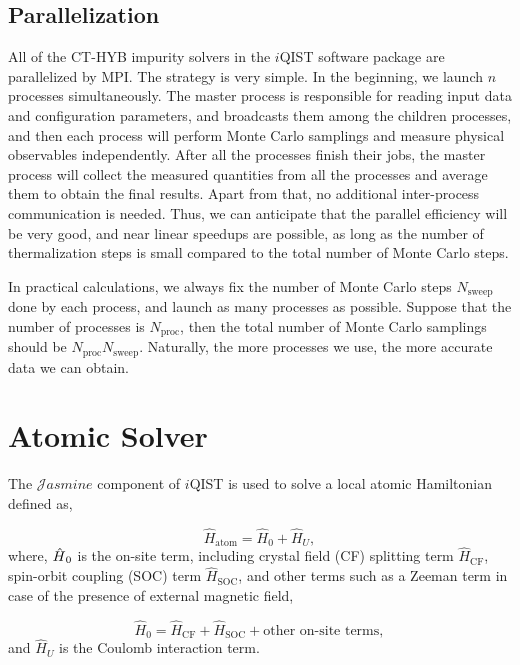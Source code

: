 \subsection{Parallelization}
All of the CT-HYB impurity solvers in the $i$QIST software package are parallelized by MPI. The strategy is very simple. In the beginning, we launch $n$ processes simultaneously. The master process is responsible for reading input data and configuration parameters, and broadcasts them among the children processes, and then each process will perform Monte Carlo samplings and measure physical observables independently. After all the processes finish their jobs, the master process will collect the measured quantities from all the processes and average them to obtain the final results. Apart from that, no additional inter-process communication is needed. Thus, we can anticipate that the parallel efficiency will be very good, and near linear speedups are possible, as long as the number of thermalization steps is small compared to the total number of Monte Carlo steps. 

In practical calculations, we always fix the number of Monte Carlo steps $N_{\text{sweep}}$ done by each process, and launch as many processes as possible. Suppose that the number of processes is $N_{\text{proc}}$, then the total number of Monte Carlo samplings should be $N_{\text{proc}}N_{\text{sweep}}$. Naturally, the more processes we use, the more accurate data we can obtain.

\section{Atomic Solver}
The $\mathcal{J}asmine$ component of $i$QIST is used to solve a local atomic Hamiltonian defined as,

\begin{equation}
\hat{H}_{\text{atom}}=\hat{H}_{0}+\hat{H}_{U},
\end{equation}
where, $\text{\ensuremath{\hat{H}}}_{0}$ is the on-site term, including
crystal field (CF) splitting term $\hat{H}_{\text{CF}}$, spin-orbit
coupling (SOC) term $\hat{H}_{\text{SOC}}$, and other terms such
as a Zeeman term in case of the presence of external magnetic field,

\begin{equation}
\hat{H}_{0}=\hat{H}_{\text{CF}}+\hat{H}_{\text{SOC}}+\text{other on-site terms},
\end{equation}
and $\hat{H}_{U}$ is the Coulomb interaction term.

